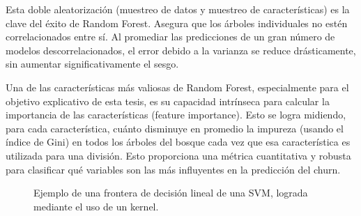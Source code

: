 Esta doble aleatorización (muestreo de datos y muestreo de características) es la clave del éxito de Random Forest. Asegura que los árboles individuales no estén correlacionados entre sí. Al promediar las predicciones de un gran número de modelos descorrelacionados, el error debido a la varianza se reduce drásticamente, sin aumentar significativamente el sesgo.

Una de las características más valiosas de Random Forest, especialmente para el objetivo explicativo de esta tesis, es su capacidad intrínseca para calcular la importancia de las características (feature importance). Esto se logra midiendo, para cada característica, cuánto disminuye en promedio la impureza (usando el índice de Gini) en todos los árboles del bosque cada vez que esa característica es utilizada para una división. Esto proporciona una métrica cuantitativa y robusta para clasificar qué variables son las más influyentes en la predicción del churn.

\begin{figure}
	\centering
	\caption{Ejemplo de una frontera de decisión lineal de una SVM, lograda mediante el uso de un kernel.}
	\label{fig:svm_simple}
\end{figure}

